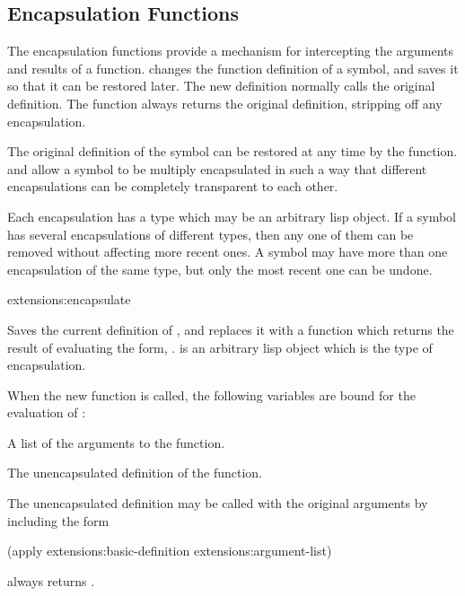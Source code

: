 \subsection{Encapsulation Functions}

The encapsulation functions provide a mechanism for intercepting the
arguments and results of a function.   changes the
function definition of a symbol, and saves it so that it can be
restored later.  The new definition normally calls the original
definition.  The \clisp{}  function always returns
the original definition, stripping off any encapsulation.

The original definition of the symbol can be restored at any time by
the  function.   and 
allow a symbol to be multiply encapsulated in such a way that different
encapsulations can be completely transparent to each other.

Each encapsulation has a type which may be an arbitrary lisp object.
If a symbol has several encapsulations of different types, then any
one of them can be removed without affecting more recent ones.
A symbol may have more than one encapsulation of the same type, but
only the most recent one can be undone.

\begin{defun}{extensions:}{encapsulate}{%
    }
  
  Saves the current definition of , and replaces it with a
  function which returns the result of evaluating the form,
  .   is an arbitrary lisp object which is the
  type of encapsulation.
  
  When the new function is called, the following variables are bound
  for the evaluation of :
  \begin{Lentry}
    
  \item[\code{extensions:argument-list}] A list of the arguments to
    the function.
    
  \item[\code{extensions:basic-definition}] The unencapsulated
    definition of the function.
  \end{Lentry}
  The unencapsulated definition may be called with the original
  arguments by including the form
  \begin{lisp}
    (apply extensions:basic-definition extensions:argument-list)
  \end{lisp}

   always returns .
\end{defun}

